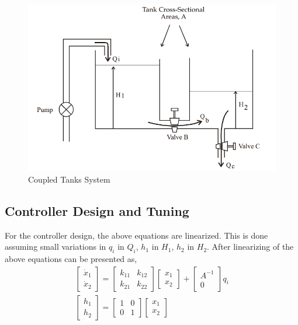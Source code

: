 \begin{figure}
\centering
\includegraphics[width=0.7\linewidth]{Appendix3/CoupledTank}
\caption{Coupled Tanks System \cite{Laubwald2006}}
\label{fig:CoupledTank}
\end{figure}


\subsection{Controller Design and Tuning}
For the controller design, the above equations are linearized. This is done assuming small variations in $q_i$ in $Q_i$, $h_1$ in $H_1$, $h_2$ in $H_2$. After linearizing of the above equations can be presented as,
\[\begin{array}{l}
\left[ {\begin{array}{*{20}{c}}
	{{{\dot x}_1}}\\
	{{{\dot x}_2}}
	\end{array}} \right] = \left[ {\begin{array}{*{20}{c}}
	{{k_{11}}}&{{k_{12}}}\\
	{{k_{21}}}&{{k_{22}}}
	\end{array}} \right]\left[ {\begin{array}{*{20}{c}}
	{{x_1}}\\
	{{x_2}}
	\end{array}} \right] + \left[ {\begin{array}{*{20}{c}}
	{{A^{ - 1}}}\\
	0
	\end{array}} \right]{q_i}\\
\left[ {\begin{array}{*{20}{c}}
	{{h_1}}\\
	{{h_2}}
	\end{array}} \right] = \left[ {\begin{array}{*{20}{c}}
	1&0\\
	0&1
	\end{array}} \right]\left[ {\begin{array}{*{20}{c}}
	{{x_1}}\\
	{{x_2}}
	\end{array}} \right]
\end{array}\]

